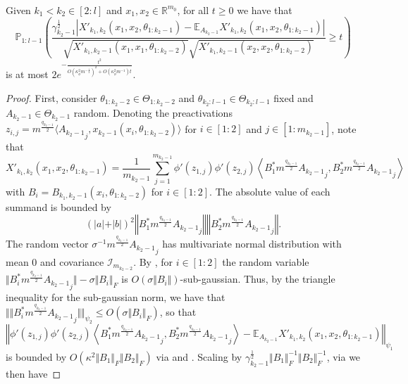 \documentclass[twoside,11pt]{article}
\newcommand{\R}{\mathbb{R}}
\newcommand{\E}{\mathbb{E}}
\newcommand{\Prob}{\mathbb{P}}
\newcommand{\Id}{\mathcal{I}}
\begin{document}
\begin{proposition}\label{prop:bwd_concentration_2}~\\
Given $k_1 < k_2 \in [2:l]$ and $x_1,x_2 \in \R^{m_0}$, for all $t \geq 0$ we have that
\[
\Prob_{1:l-1}\left( \frac{\gamma_{k_2-1}^{\frac{1}{2}} \left\vert X'_{k_1,k_2}(x_1,x_2,\theta_{1:k_2-1}) - \E_{A_{k_2-1}} X'_{k_1,k_2}(x_1,x_2,\theta_{1:k_2-1}) \right\vert}{\sqrt{X'_{k_1,k_2-1}(x_1,x_1,\theta_{1:k_2-2})} \sqrt{X'_{k_1,k_2-1}(x_2,x_2,\theta_{1:k_2-2})}} \geq t \right)
\]
is at most $2e^{-\frac{t^2}{O\left( \kappa_\phi^2 m^{-\frac{1}{2}} \right)^2 + O\left( \kappa_\phi^2 m^{-1} \right) t}}$.
\end{proposition}
\begin{proof}
First, consider $\theta_{1:k_2-2} \in \Theta_{1:k_2-2}$ and $\theta_{k_2:l-1} \in \Theta_{k_2:l-1}$ fixed and $A_{k_2-1} \in \Theta_{k_2-1}$ random. Denoting the preactivations $z_{i,j} = m^{\frac{q_{k_2-1}}{2}} \langle {A_{k_2-1}}_j, x_{k_2-1}(x_i, \theta_{1 : k_2-2}) \rangle$ for $i \in [1:2]$ and $j \in [1:m_{k_2-1}]$, note that
\[
X'_{k_1,k_2}(x_1,x_2,\theta_{1:k_2-1})
= \frac{1}{m_{k_2-1}} \sum_{j=1}^{m_{k_2-1}} \phi'(z_{1,j}) \phi'(z_{2,j})
\left\langle B_1^* m^{\frac{q_{k_2-1}}{2}} {A_{k_2-1}}_j, B_2^* m^{\frac{q_{k_2-1}}{2}} {A_{k_2-1}}_j \right\rangle
\]
with $B_i = B_{k_1,k_2-1}(x_i,\theta_{1:k_2-2})$ for $i \in [1:2]$. The absolute value of each summand is bounded by 
\[
(\vert a \vert + \vert b \vert)^2 \left\Vert B_1^* m^{\frac{q_{k_2-1}}{2}} {A_{k_2-1}}_j \right\Vert \left\Vert B_2^* m^{\frac{q_{k_2-1}}{2}} {A_{k_2-1}}_j \right\Vert.
\]
The random vector $\sigma^{-1} m^{\frac{q_{k_2-1}}{2}} {A_{k_2-1}}_j$ has multivariate normal distribution with mean $0$ and covariance $\Id_{m_{k_2-2}}$. By \cite[Theorem~6.3.2]{Vershynin2018}, for $i \in [1:2]$ the random variable $\Vert B_i^* m^{\frac{q_{k_2-1}}{2}} {A_{k_2-1}}_j \Vert - \sigma \Vert B_i \Vert_F$ is $O(\sigma \Vert B_i \Vert)$-sub-gaussian. Thus, by the triangle inequality for the sub-gaussian norm, we have that $\Vert \Vert B_i^* m^{\frac{q_{k_2-1}}{2}} {A_{k_2-1}}_j \Vert \Vert_{\psi_2} \leq O( \sigma \Vert B_i \Vert_F )$, so that
\[
\left\Vert \phi'(z_{1,j}) \phi'(z_{2,j})
\left\langle B_1^* m^{\frac{q_{k_2-1}}{2}} {A_{k_2-1}}_j, B_2^* m^{\frac{q_{k_2-1}}{2}} {A_{k_2-1}}_j \right\rangle
- \E_{A_{k_2-1}} X'_{k_1,k_2}(x_1,x_2,\theta_{1:k_2-1}) \right\Vert_{\psi_1}
\]
is bounded by $O(\kappa^2 \Vert B_1 \Vert_F \Vert B_2 \Vert_F)$ via \citet[Lemma~2.7.7]{Vershynin2018} and \citet[Exercise~2.7.10]{Vershynin2018}. Scaling by $\gamma_{k_2-1}^{\frac{1}{2}} \Vert B_1 \Vert_F^{-1} \Vert B_2 \Vert_F^{-1}$, via \citet[Corollary~2.8.3]{Vershynin2018} we then have

\end{proof}
\end{document}

